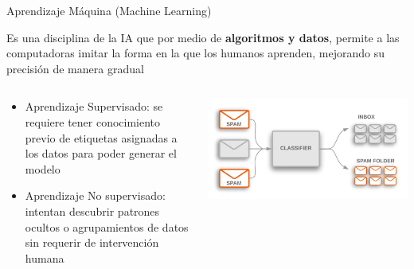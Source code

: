 

\begin{frame}{Aprendizaje Máquina (Machine Learning)}

Es una disciplina de la IA que por medio de \textbf{algoritmos y datos}, permite a las computadoras imitar la forma en la que los humanos aprenden, mejorando su precisión de manera gradual
\begin{columns}
\begin{column}{0.48\textwidth}
\begin{itemize}
\item Aprendizaje Supervisado: se requiere tener conocimiento previo de etiquetas asignadas a los datos para poder generar el modelo
\item Aprendizaje No supervisado: intentan descubrir patrones ocultos o agrupamientos de datos sin requerir de intervención humana
\end{itemize}
\end{column}
\begin{column}{0.52\textwidth}  
    \begin{center}
     \includegraphics[width=\textwidth]{00_IntroMachineLearning/figs/Classifier}
     \end{center}
\end{column}
\end{columns}


\end{frame}

